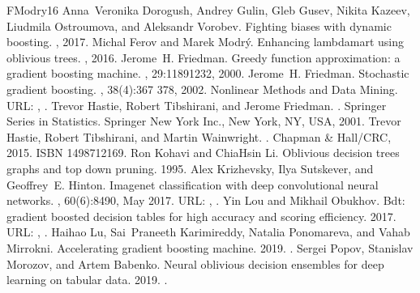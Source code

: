 \documentclass[letterpaper,10pt,english]{sphinxmanual}
\begin{document}
\begin{sphinxthebibliography}{FModry16}
Anna Veronika Dorogush, Andrey Gulin, Gleb Gusev, Nikita Kazeev, Liudmila Ostroumova, and Aleksandr Vorobev. Fighting biases with dynamic boosting. , 2017.
Michal Ferov and Marek Modrý. Enhancing lambdamart using oblivious trees. , 2016.
Jerome H. Friedman. Greedy function approximation: a gradient boosting machine. , 29:1189\textendash{}1232, 2000.
Jerome H. Friedman. Stochastic gradient boosting. , 38(4):367 \textendash{} 378, 2002. Nonlinear Methods and Data Mining. URL: , .
Trevor Hastie, Robert Tibshirani, and Jerome Friedman. . Springer Series in Statistics. Springer New York Inc., New York, NY, USA, 2001.
Trevor Hastie, Robert Tibshirani, and Martin Wainwright. . Chapman \& Hall/CRC, 2015. ISBN 1498712169.
Ron Kohavi and Chia\sphinxhyphen{}Hsin Li. Oblivious decision trees graphs and top down pruning. 1995.
Alex Krizhevsky, Ilya Sutskever, and Geoffrey E. Hinton. Imagenet classification with deep convolutional neural networks. , 60(6):84\textendash{}90, May 2017. URL: , .
Yin Lou and Mikhail Obukhov. Bdt: gradient boosted decision tables for high accuracy and scoring efficiency. 2017. URL: , .
Haihao Lu, Sai Praneeth Karimireddy, Natalia Ponomareva, and Vahab Mirrokni. Accelerating gradient boosting machine. 2019. .
Sergei Popov, Stanislav Morozov, and Artem Babenko. Neural oblivious decision ensembles for deep learning on tabular data. 2019. .

\end{sphinxthebibliography}
\end{document}

